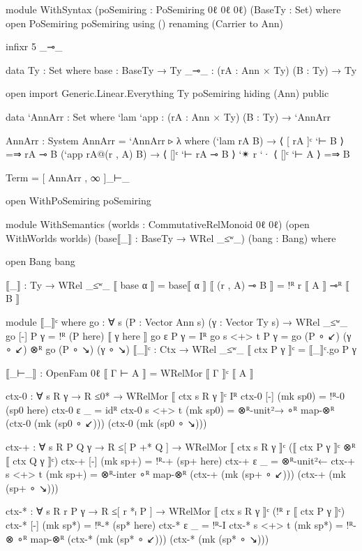 \begin{code}
  module WithSyntax (poSemiring : PoSemiring 0ℓ 0ℓ 0ℓ) (BaseTy : Set) where
    open PoSemiring poSemiring using () renaming (Carrier to Ann)

    infixr 5 _⊸_

    data Ty : Set where
      base : BaseTy → Ty
      _⊸_ : (rA : Ann × Ty) (B : Ty) → Ty

    open import Generic.Linear.Everything Ty poSemiring hiding (Ann) public

    data `AnnArr : Set where
      `lam `app : (rA : Ann × Ty) (B : Ty) → `AnnArr

    AnnArr : System
    AnnArr = `AnnArr ▹ λ where
      (`lam rA B) → ⟨ [ rA ]ᶜ `⊢ B ⟩ =⇒ rA ⊸ B
      (`app rA@(r , A) B) → ⟨ []ᶜ `⊢ rA ⊸ B ⟩ `✴ r `· ⟨ []ᶜ `⊢ A ⟩ =⇒ B

    Term = [ AnnArr , ∞ ]_⊢_

    open WithPoSemiring poSemiring

    module WithSemantics
      (worlds : CommutativeRelMonoid 0ℓ 0ℓ) (open WithWorlds worlds)
      (base⟦_⟧ : BaseTy → WRel _≤ʷ_) (bang : Bang)
      where

      open Bang bang

      ⟦_⟧ : Ty → WRel _≤ʷ_
      ⟦ base α ⟧ = base⟦ α ⟧
      ⟦ (r , A) ⊸ B ⟧ = !ᴿ r ⟦ A ⟧ ⊸ᴿ ⟦ B ⟧

      module ⟦_⟧ᶜ where
        go : ∀ {s} (P : Vector Ann s) (γ : Vector Ty s) → WRel _≤ʷ_
        go {[-]} P γ = !ᴿ (P here) ⟦ γ here ⟧
        go {ε} P γ = Iᴿ
        go {s <+> t} P γ = go (P ∘ ↙) (γ ∘ ↙) ⊗ᴿ go (P ∘ ↘) (γ ∘ ↘)
      ⟦_⟧ᶜ : Ctx → WRel _≤ʷ_
      ⟦ ctx P γ ⟧ᶜ = ⟦_⟧ᶜ.go P γ

      ⟦_⊢_⟧ : OpenFam 0ℓ
      ⟦ Γ ⊢ A ⟧ = WRelMor ⟦ Γ ⟧ᶜ ⟦ A ⟧

      ctx-0 : ∀ {s R γ} → R ≤0* → WRelMor ⟦ ctx {s} R γ ⟧ᶜ Iᴿ
      ctx-0 {[-]} (mk sp0) = !ᴿ-0 (sp0 here)
      ctx-0 {ε} _ = idᴿ
      ctx-0 {s <+> t} (mk sp0) =
        ⊗ᴿ-unit²→ ∘ᴿ map-⊗ᴿ (ctx-0 (mk (sp0 ∘ ↙))) (ctx-0 (mk (sp0 ∘ ↘)))

      ctx-+ : ∀ {s R P Q γ} → R ≤[ P +* Q ] →
        WRelMor ⟦ ctx {s} R γ ⟧ᶜ (⟦ ctx P γ ⟧ᶜ ⊗ᴿ ⟦ ctx Q γ ⟧ᶜ)
      ctx-+ {[-]} (mk sp+) = !ᴿ-+ (sp+ here)
      ctx-+ {ε} _ = ⊗ᴿ-unit²←
      ctx-+ {s <+> t} (mk sp+) =
        ⊗ᴿ-inter ∘ᴿ map-⊗ᴿ (ctx-+ (mk (sp+ ∘ ↙))) (ctx-+ (mk (sp+ ∘ ↘)))

      ctx-* : ∀ {s R r P γ} → R ≤[ r *ₗ P ] →
        WRelMor ⟦ ctx {s} R γ ⟧ᶜ (!ᴿ r ⟦ ctx P γ ⟧ᶜ)
      ctx-* {[-]} (mk sp*) = !ᴿ-* (sp* here)
      ctx-* {ε} _ = !ᴿ-I
      ctx-* {s <+> t} (mk sp*) =
        !ᴿ-⊗ ∘ᴿ map-⊗ᴿ (ctx-* (mk (sp* ∘ ↙))) (ctx-* (mk (sp* ∘ ↘)))


\end{code}
